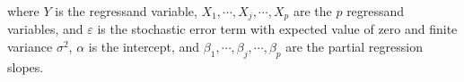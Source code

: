 \noindent where
$Y$ is the regressand variable,
$X_1, \cdots, X_j, \cdots, X_p$ are the $p$ regressand variables,
and
$\varepsilon$ is the stochastic error term
with expected value of zero and finite variance $\sigma^2$,
$\alpha$ is the intercept,
and
$\beta_1, \cdots, \beta_j, \cdots, \beta_p$
are the partial regression slopes.